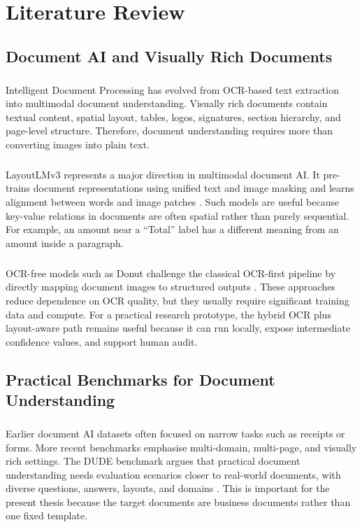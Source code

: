 \chapter{Literature Review}
\label{chap:literature_review}

\section{Document AI and Visually Rich Documents}
\paragraph{} Intelligent Document Processing has evolved from OCR-based text extraction into multimodal document understanding. Visually rich documents contain textual content, spatial layout, tables, logos, signatures, section hierarchy, and page-level structure. Therefore, document understanding requires more than converting images into plain text.

\paragraph{} LayoutLMv3 represents a major direction in multimodal document AI. It pre-trains document representations using unified text and image masking and learns alignment between words and image patches \cite{huang2022layoutlmv3}. Such models are useful because key-value relations in documents are often spatial rather than purely sequential. For example, an amount near a ``Total'' label has a different meaning from an amount inside a paragraph.

\paragraph{} OCR-free models such as Donut challenge the classical OCR-first pipeline by directly mapping document images to structured outputs \cite{kim2022donut}. These approaches reduce dependence on OCR quality, but they usually require significant training data and compute. For a practical research prototype, the hybrid OCR plus layout-aware path remains useful because it can run locally, expose intermediate confidence values, and support human audit.

\section{Practical Benchmarks for Document Understanding}
\paragraph{} Earlier document AI datasets often focused on narrow tasks such as receipts or forms. More recent benchmarks emphasise multi-domain, multi-page, and visually rich settings. The DUDE benchmark argues that practical document understanding needs evaluation scenarios closer to real-world documents, with diverse questions, answers, layouts, and domains \cite{vanlandeghem2023dude}. This is important for the present thesis because the target documents are business documents rather than one fixed template.

